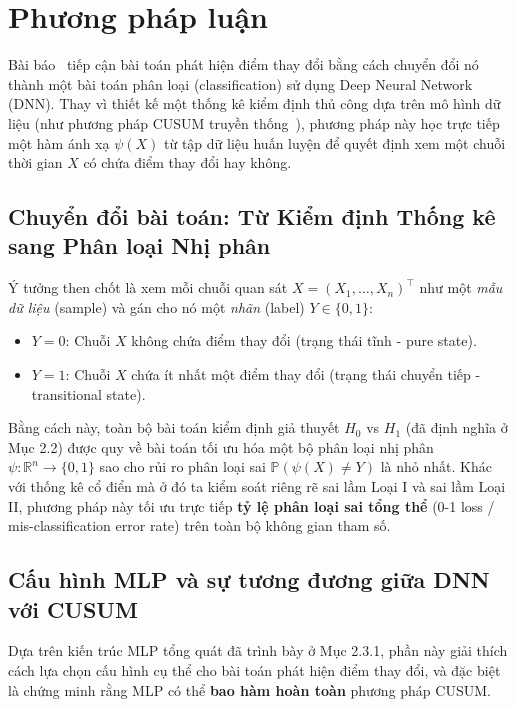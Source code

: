 \section{Phương pháp luận}

Bài báo~\cite{li2024automatic} tiếp cận bài toán phát hiện điểm thay đổi bằng cách chuyển đổi nó thành một bài toán phân
loại (classification) sử dụng Deep Neural Network (DNN). Thay vì thiết kế một thống kê kiểm định thủ công dựa
trên mô hình dữ liệu (như phương pháp CUSUM truyền thống~\cite{page1954cusum}),
phương pháp này học trực tiếp một hàm ánh xạ $\psi(X)$ từ tập dữ liệu huấn luyện để quyết định
xem một chuỗi thời gian $X$ có chứa điểm thay đổi hay không.

\subsection{Chuyển đổi bài toán: Từ Kiểm định Thống kê sang Phân loại Nhị phân}

Ý tưởng then chốt là xem mỗi chuỗi quan sát $X = (X_1, \ldots, X_n)^\top$ như một \textit{mẫu dữ liệu} (sample) 
và gán cho nó một \textit{nhãn} (label) $Y \in \{0, 1\}$:
\begin{itemize}
    \item $Y = 0$: Chuỗi $X$ không chứa điểm thay đổi (trạng thái tĩnh - pure state).
    \item $Y = 1$: Chuỗi $X$ chứa ít nhất một điểm thay đổi (trạng thái chuyển tiếp - transitional state).
\end{itemize}

Bằng cách này, toàn bộ bài toán kiểm định giả thuyết $H_0$ vs $H_1$ (đã định nghĩa ở Mục 2.2) 
được quy về bài toán tối ưu hóa một bộ phân loại nhị phân $\psi: \mathbb{R}^n \rightarrow \{0, 1\}$ 
sao cho rủi ro phân loại sai $\mathbb{P}(\psi(X) \neq Y)$ là nhỏ nhất. Khác với thống kê cổ điển mà ở đó 
ta kiểm soát riêng rẽ sai lầm Loại I và sai lầm Loại II, phương pháp này tối
 ưu trực tiếp \textbf{tỷ lệ phân loại sai tổng thể} (0-1 loss / mis-classification error rate)
  trên toàn bộ không gian tham số.

\subsection{Cấu hình MLP và sự tương đương giữa DNN với CUSUM}

Dựa trên kiến trúc MLP tổng quát đã trình bày ở Mục 2.3.1, phần này giải thích cách lựa chọn cấu hình
 cụ thể cho bài toán phát hiện điểm thay đổi, và đặc biệt là chứng minh rằng MLP có
  thể \textbf{bao hàm hoàn toàn} phương pháp CUSUM.

